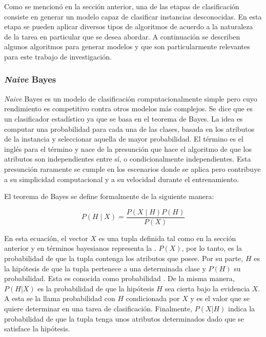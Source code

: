 Como se mencionó en la sección anterior, una de las etapas de clasificación
consiste en generar un modelo capaz de clasificar instancias desconocidas. En
esta etapa se pueden aplicar diversos tipos de algoritmos de acuerdo a la
naturaleza de la tarea en particular que se desea abordar. A continuación se
describen algunos algoritmos para generar modelos y que son particularmente
relevantes para este trabajo de investigación.

\subsubsection{\textit{Naive} Bayes}

\textit{Naive} Bayes es un modelo de clasificación computacionalmente simple
pero cuyo rendimiento es competitivo contra otros modelos más complejos. Se dice
que es un clasificador estadístico ya que se basa en el teorema de Bayes. La
idea es computar una probabilidad para cada una de las clases, basada en los
atributos de la instancia y seleccionar aquella de mayor probabilidad. El
término  es el inglés para el término
 y nace de la presunción que hace el algoritmo de que
los atributos son independientes entre sí, o condicionalmente independientes.
Esta presunción raramente se cumple en los escenarios donde se aplica pero
contribuye a su simplicidad computacional y a su velocidad durante el
entrenamiento.

El teorema de Bayes se define formalmente de la siguiente manera:

\begin{equation}
   P(H \mid X) = \frac{P(X \mid H) P(H)}{P(X)}
\end{equation}

En esta ecuación, el vector $X$ es una tupla definida tal como en la sección
anterior y en términos bayesianos representa la . $P(X)$,
por lo tanto, es la probabilidad de que la tupla contenga los atributos que
posee. Por su parte, $H$ es la hipótesis de que la tupla pertenece a una
determinada clase y $P(H)$ su probabilidad. Esta es conocida como probabilidad
. De la misma manera, $P(H|X)$ es la probabilidad de que la
hipótesis $H$ sea cierta bajo la evidencia $X$. A esta se la llama probabilidad
 con $H$ condicionada por $X$ y es el valor que se quiere
determinar en una tarea de clasificación.  Finalmente, $P(X|H)$ indica la
probabilidad de que la tupla tenga unos atributos determinados dado que se
satisface la hipótesis.

